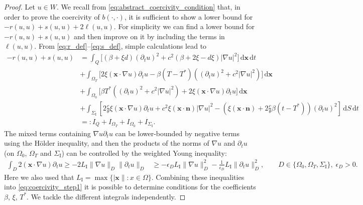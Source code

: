 \documentclass[a4paper]{article}
\theoremstyle{plain}
\theoremstyle{definition}
\newcommand{\norm}[1]{\|#1\|}
\newcommand{\dx}{{\,\mathrm{d}\vect x}}
\newcommand{\dt}{{\,\mathrm{d}t}}
\newcommand{\dS}{{\,\mathrm{d}S}}
\newcommand{\Grad}[1]{\nabla #1}
\newcommand{\TimeDer}{{\partial^{}_t}}
\newcommand{\vect}[1]{\bm{#1}}
\newcommand{\LI}{L_{\mathrm I}}
\newcommand{\SI}{{\Sigma_{\mathrm I}}}
\newcommand{\vx}{{\vect x}}
\newcommand{\OT}{{\Omega_T}}
\newcommand{\OZ}{{\Omega_0}}
\begin{document}
\begin{proof}
	Let $u \in W$.
	We recall from \eqref{eq:abstract_coercivity_condition} that, in order to prove the coercivity of $b(\cdot,\cdot)$, it is sufficient to show a lower bound for $-r(u,u) + s(u,u) + 2\ell(u,u)$. For simplicity we can find a lower bound for $-r(u,u) + s(u,u)$ and then improve on it by including the terms in $\ell(u,u)$.
	From \eqref{eq:r_def}--\eqref{eq:s_def}, simple calculations lead to
	\begin{align}\nonumber
		-r(u,u) + s(u,u) & =
		\int_{Q} \big[
			(\beta + \xi d) (\TimeDer{u})^2
			+ c^2 ( \beta + 2\xi - d\xi)|\Grad u|^2
		\big] \dx \dt                                           \\ \nonumber
		                 & + \int_{\OT} \big[
			2 \xi (\vect{x} \cdot \Grad u) \TimeDer{u}
			- \beta (T-T^*)\left(
			(\TimeDer{u})^2
			+ c^2 |\Grad u|^2
		\right) \big] \dx                                       \\
		                 & + \int_{\OZ}
		\big[\beta T^* \left(
			(\TimeDer{u})^2
			+ c^2 |\Grad u|^2\right)
			+ 2 \xi (\vect{x} \cdot \Grad u) \TimeDer{u} \big]\dx
		\label{eq:coercivity_step1}                             \\
		                 & + \int_{{\SI}} \left[
			2 \frac c\theta\xi (\vect{x} \cdot \Grad u) \TimeDer{u}
+ c^2 \xi (\vect{x} \cdot \vect{n}) |\Grad u|^2
			- \left(\xi (\vect{x} \cdot \vect{n})
			+ 2\frac{c}{\theta}{\beta} (t-T^*)\right) (\TimeDer{u})^2
			\right] \dS \dt
		\nonumber
		\\
		                 & =: I_Q+I_\OT+I_\OZ+I_{\SI}.\nonumber
	\end{align}
	The mixed terms containing $\Grad u \TimeDer{u}$ can be lower-bounded by negative terms using the H\"older inequality, and then the products of the norms of $\Grad u$ and $\TimeDer{u}$ (on $\OZ$, $\OT$ and ${\SI}$) can be controlled by the weighted Young inequality:
\begin{align*}
		\int_{D}2  (\vect{x} \cdot \Grad u) \TimeDer{u} \ge - 2 \LI \norm{\Grad u}_D \norm{\TimeDer{u}}_D
		 & \geq -\epsilon_D \LI \norm{\Grad u}^2_D -\frac{1}{\epsilon_D} \LI \norm{\TimeDer{u}}^2_D,
		\qquad D\in\{\Omega_0,\Omega_T,{\SI}\},\; \epsilon_D>0.
	\end{align*}
Here we also used that $\LI = \max\{|\vx\|: x\in\Omega\}$.
	Combining these inequalities into \eqref{eq:coercivity_step1} it is possible to determine conditions for the coefficients $\beta$, $\xi$, $T^*$.
	We tackle the different integrals independently.


\end{proof}
\end{document}
